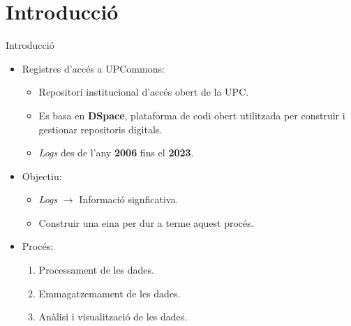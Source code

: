 \section{Introducció}\label{sec:introduction}

\begin{frame}{Introducció}
    \begin{itemize}%
        \item Registres d'accés a UPCommons:
        \begin{itemize}%
            \item Repositori institucional d’accés obert de la UPC.
            \item Es basa en \textbf{DSpace}, plataforma de codi obert utilitzada per construir i gestionar repositoris digitals.
            \item \textit{Logs} des de l'any \textbf{2006} fins el \textbf{2023}.
        \end{itemize}
        \item Objectiu:
        \begin{itemize}
            \item \textit{Logs} \(\rightarrow\) Informació signficativa.
            \item Construir una eina per dur a terme aquest procés.
        \end{itemize}
        \item Procés:
        \begin{enumerate}
            \item Processament de les dades.
            \item Emmagatzemament de les dades.
            \item Anàlisi i visualització de les dades.
        \end{enumerate}
    \end{itemize}
\end{frame}